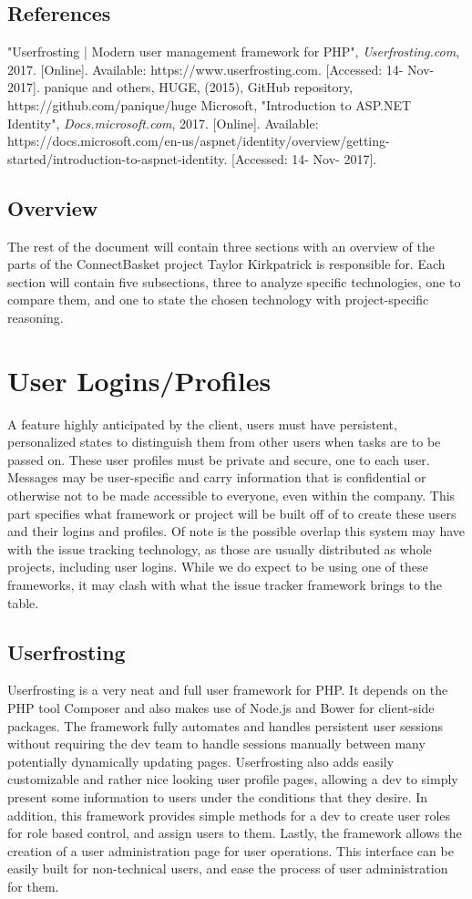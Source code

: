 \documentclass[onecolumn, draftclsnofoot,10pt, compsoc]{IEEEtran}
\begin{document}
\subsection{References}
"Userfrosting | Modern user management framework for PHP", \textit{Userfrosting.com}, 2017. [Online]. Available: https://www.userfrosting.com. [Accessed: 14- Nov- 2017].
panique and others, HUGE, (2015), GitHub repository, https://github.com/panique/huge
Microsoft, "Introduction to ASP.NET Identity", \textit{Docs.microsoft.com}, 2017. [Online]. Available: https://docs.microsoft.com/en-us/aspnet/identity/overview/getting-started/introduction-to-aspnet-identity. [Accessed: 14- Nov- 2017].

\subsection{Overview}
The rest of the document will contain three sections with an overview of the parts of the ConnectBasket project Taylor Kirkpatrick 
is responsible for. Each section will contain five subsections, three to analyze specific technologies, one to compare them, and one 
to state the chosen technology with project-specific reasoning.

\section{User Logins/Profiles}
A feature highly anticipated by the client, users must have persistent, personalized states to distinguish them from other users when tasks are to be 
passed on. These user profiles must be private and secure, one to each user. Messages may be user-specific and carry information that is confidential 
or otherwise not to be made accessible to everyone, even within the company. This part specifies what framework or project will be built off of to 
create these users and their logins and profiles. Of note is the possible overlap this system may have with the issue tracking technology, as those are 
usually distributed as whole projects, including user logins. While we do expect to be using one of these frameworks, it may clash with what the issue tracker 
framework brings to the table.
\subsection{Userfrosting}
Userfrosting is a very neat and full user framework for PHP. It depends on the PHP tool Composer and also makes use of Node.js and Bower for client-side packages.
The framework fully automates and handles persistent user sessions without requiring the dev team to handle sessions manually between many potentially dynamically updating 
pages. Userfrosting also adds easily customizable and rather nice looking user profile pages, allowing a dev to simply present some information to users under the conditions 
that they desire. In addition, this framework provides simple methods for a dev to create user roles for role based control, and assign users to them. Lastly, the framework 
allows the creation of a user administration page for user operations. This interface can be easily built for non-technical users, and ease the process of user administration 
for them.
\end{document}
